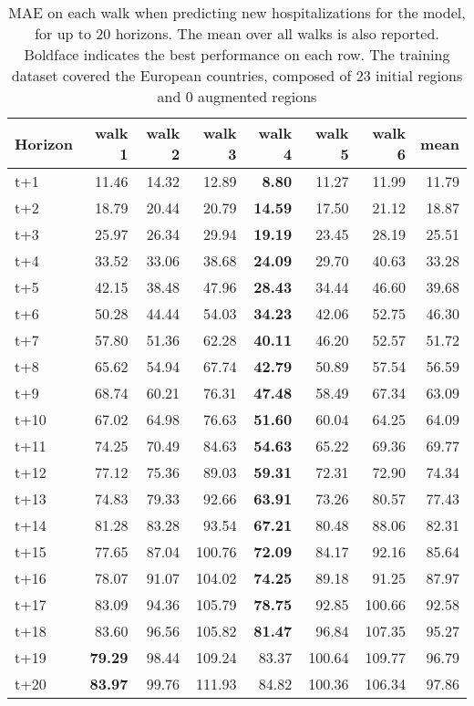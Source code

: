 \begin{table}[H]
\centering
\caption{MAE on each walk when predicting new hospitalizations for the model, for up to 20 horizons. The mean over all walks is also reported. Boldface indicates the best performance on each row. The training dataset covered the European countries, composed of 23 initial regions and 0 augmented regions }
\label{tab:MAE_walk_dense_model}
\begin{tabular}{lrrrrrrr}
\toprule
Horizon &  walk 1 &  walk 2 &  walk 3 &  walk 4 &  walk 5 &  walk 6 &  mean \\
\midrule
t+1  & 11.46  & 14.32  & 12.89  & \textbf{8.80}  & 11.27  & 11.99  & 11.79  \\
t+2  & 18.79  & 20.44  & 20.79  & \textbf{14.59}  & 17.50  & 21.12  & 18.87  \\
t+3  & 25.97  & 26.34  & 29.94  & \textbf{19.19}  & 23.45  & 28.19  & 25.51  \\
t+4  & 33.52  & 33.06  & 38.68  & \textbf{24.09}  & 29.70  & 40.63  & 33.28  \\
t+5  & 42.15  & 38.48  & 47.96  & \textbf{28.43}  & 34.44  & 46.60  & 39.68  \\
t+6  & 50.28  & 44.44  & 54.03  & \textbf{34.23}  & 42.06  & 52.75  & 46.30  \\
t+7  & 57.80  & 51.36  & 62.28  & \textbf{40.11}  & 46.20  & 52.57  & 51.72  \\
t+8  & 65.62  & 54.94  & 67.74  & \textbf{42.79}  & 50.89  & 57.54  & 56.59  \\
t+9  & 68.74  & 60.21  & 76.31  & \textbf{47.48}  & 58.49  & 67.34  & 63.09  \\
t+10  & 67.02  & 64.98  & 76.63  & \textbf{51.60}  & 60.04  & 64.25  & 64.09  \\
t+11  & 74.25  & 70.49  & 84.63  & \textbf{54.63}  & 65.22  & 69.36  & 69.77  \\
t+12  & 77.12  & 75.36  & 89.03  & \textbf{59.31}  & 72.31  & 72.90  & 74.34  \\
t+13  & 74.83  & 79.33  & 92.66  & \textbf{63.91}  & 73.26  & 80.57  & 77.43  \\
t+14  & 81.28  & 83.28  & 93.54  & \textbf{67.21}  & 80.48  & 88.06  & 82.31  \\
t+15  & 77.65  & 87.04  & 100.76  & \textbf{72.09}  & 84.17  & 92.16  & 85.64  \\
t+16  & 78.07  & 91.07  & 104.02  & \textbf{74.25}  & 89.18  & 91.25  & 87.97  \\
t+17  & 83.09  & 94.36  & 105.79  & \textbf{78.75}  & 92.85  & 100.66  & 92.58  \\
t+18  & 83.60  & 96.56  & 105.82  & \textbf{81.47}  & 96.84  & 107.35  & 95.27  \\
t+19  & \textbf{79.29}  & 98.44  & 109.24  & 83.37  & 100.64  & 109.77  & 96.79  \\
t+20  & \textbf{83.97}  & 99.76  & 111.93  & 84.82  & 100.36  & 106.34  & 97.86  \\

\bottomrule
\end{tabular}
\end{table}
